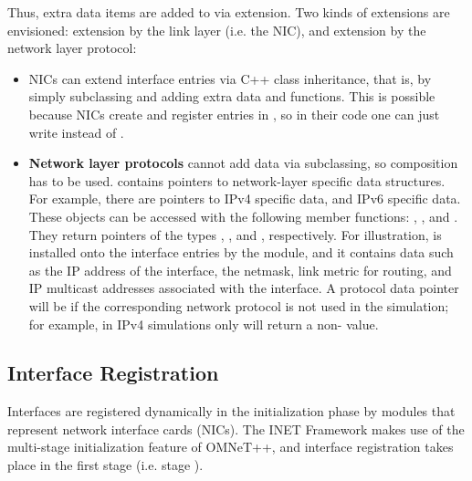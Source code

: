 Thus, extra data items are added to  via
extension. Two kinds of extensions are envisioned: extension by the link
layer (i.e. the NIC), and extension by the network layer protocol:

\begin{itemize}

\item NICs can extend interface entries via C++ class inheritance, that is, by
simply subclassing  and adding extra data and
functions. This is possible because NICs create and register entries in
, so in their code one can just write
 instead of .

\item \textbf{Network layer protocols} cannot add data via subclassing, so
composition has to be used.  contains pointers to
network-layer specific data structures. For example, there are pointers to
IPv4 specific data, and IPv6 specific data. These objects can be accessed with
the following  member functions: ,
, and .
They return pointers of the types ,
, and ,
respectively. For illustration,  is installed
onto the interface entries by the  module, and it
contains data such as the IP address of the interface, the netmask, link
metric for routing, and IP multicast addresses associated with the
interface. A protocol data pointer will be  if the corresponding
network protocol is not used in the simulation; for example, in IPv4
simulations only  will return a non- value.


\end{itemize}


\subsection{Interface Registration}

Interfaces are registered dynamically in the initialization phase by modules
that represent network interface cards (NICs). The INET Framework makes use
of the multi-stage initialization feature of OMNeT++, and interface registration takes
place in the first stage (i.e. stage ).

